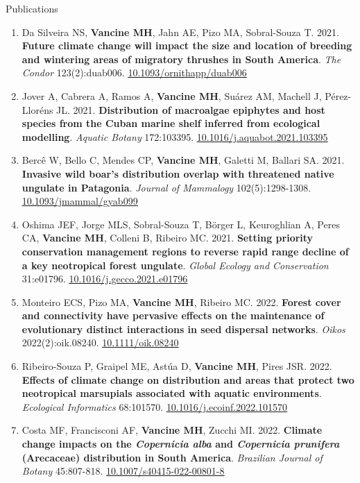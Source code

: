 \documentclass{resume}
\begin{document}
\begin{rSection}{Publications}
\begin{enumerate}
\item Da Silveira NS, {\bf Vancine MH}, Jahn AE, Pizo MA, Sobral-Souza T. 2021. {\bf Future climate change will impact the size and location of breeding and wintering areas of migratory thrushes in South America}. {\it The Condor} 123(2):duab006. \href{https://doi.org/10.1093/ornithapp/duab006}{\underline{10.1093/ornithapp/duab006}}

\item Jover A, Cabrera A, Ramos A, {\bf Vancine MH}, Suárez AM, Machell J, Pérez-Lloréns JL. 2021. {\bf Distribution of macroalgae epiphytes and host species from the Cuban marine shelf inferred from ecological modelling}. {\it Aquatic Botany} 172:103395. \href{https://doi.org/10.1016/j.aquabot.2021.103395}{\underline{10.1016/j.aquabot.2021.103395}}

\item Bercê W, Bello C, Mendes CP, {\bf Vancine MH}, Galetti M, Ballari SA. 2021. {\bf Invasive wild boar’s distribution overlap with threatened native ungulate in Patagonia}. {\it Journal of Mammalogy} 102(5):1298-1308. \href{https://doi.org/10.1093/jmammal/gyab099}{\underline{10.1093/jmammal/gyab099}}

\item Oshima JEF, Jorge MLS, Sobral-Souza T, Börger L, Keuroghlian A, Peres CA, {\bf Vancine MH}, Colleni B, Ribeiro MC. 2021. {\bf Setting priority conservation management regions to reverse rapid range decline of a key neotropical forest ungulate}. {\it Global Ecology and Conservation} 31:e01796. \href{https://doi.org/10.1016/j.gecco.2021.e01796}{\underline{10.1016/j.gecco.2021.e01796}}

\item Monteiro ECS, Pizo MA, {\bf Vancine MH}, Ribeiro MC. 2022. {\bf Forest cover and connectivity have pervasive effects on the maintenance of evolutionary distinct interactions in seed dispersal networks}. {\it Oikos} 2022(2):oik.08240. \href{https://doi.org/10.1111/oik.08240}{\underline{10.1111/oik.08240}}

\item Ribeiro-Souza P, Graipel ME, Astúa D, {\bf Vancine MH}, Pires JSR. 2022. {\bf Effects of climate change on distribution and areas that protect two neotropical marsupials associated with aquatic environments}. {\it Ecological Informatics} 68:101570. \href{https://doi.org/10.1016/j.ecoinf.2022.101570}{\underline{10.1016/j.ecoinf.2022.101570}}

\item Costa MF, Francisconi AF, {\bf Vancine MH}, Zucchi MI. 2022. {\bf Climate change impacts on the \textbf{\textit{ Copernicia alba}} and \textbf{\textit{Copernicia prunifera}} (Arecaceae) distribution in South America}. {\it Brazilian Journal of Botany} 45:807-818. \href{https://doi.org/10.1007/s40415-022-00801-8}{\underline{10.1007/s40415-022-00801-8}}


\end{enumerate}
\end{rSection}
\end{document}
